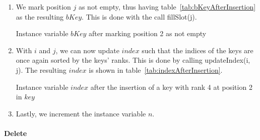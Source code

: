 \begin{enumerate}
    \item
    We mark position $j$ as not empty, thus having table~\ref{tab:bKeyAfterInsertion} as the resulting $bKey$. This is done with the call {\ttfamily fillSlot(j)}.
    \begin{table}[H]
    \centering
    
    \caption[Example $bKey$ after the insertion of a new key]{Instance variable $bKey$ after marking position 2 as not empty}
    \label{tab:bKeyAfterInsertion}
    \end{table}
    
    \item
    With $i$ and $j$, we can now update $index$ such that the indices of the keys are once again sorted by the keys' ranks. This is done by calling {\ttfamily updateIndex(i, j)}. The resulting $index$ is shown in table~\ref{tab:indexAfterInsertion}.
    \begin{table}[H]
    \centering
    
    \caption[Example $index$ after the insertion of a new key]{Instance variable $index$ after the insertion of a key with rank 4 at position 2 in $key$}
    \label{tab:indexAfterInsertion}
    \end{table}
    
    \item
    Lastly, we increment the instance variable $n$.
\end{enumerate}

\paragraph{Delete}

